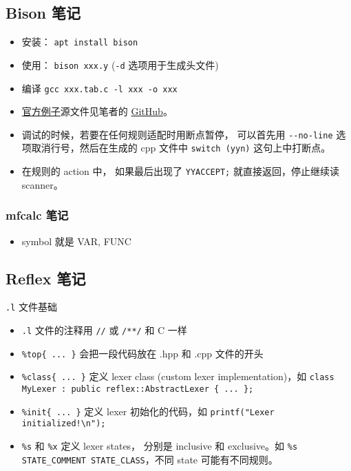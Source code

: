 \subsection{Bison 笔记}
\begin{itemize}
\item 安装： \verb`apt install bison`
\item 使用： \verb`bison xxx.y` (\verb`-d` 选项用于生成头文件)
\item 编译 \verb`gcc xxx.tab.c -l xxx -o xxx`
\item \href{http://web.mit.edu/gnu/doc/html/bison_5.html}{官方例子}源文件见笔者的 \href{https://github.com/MacroUniverse/bison_test}{GitHub}。
\item 调试的时候，若要在任何规则适配时用断点暂停， 可以首先用 \verb`--no-line` 选项取消行号，然后在生成的 cpp 文件中 \verb`switch (yyn)` 这句上中打断点。
\item 在规则的 action 中， 如果最后出现了 \verb`YYACCEPT;` 就直接返回，停止继续读 scanner。
\end{itemize}

\subsubsection{mfcalc 笔记}
\begin{itemize}
\item symbol 就是 VAR, FUNC
\end{itemize}

\subsection{Reflex 笔记}
\verb`.l` 文件基础
\begin{itemize}
\item \verb`.l` 文件的注释用 \verb`//` 或 \verb`/**/` 和 C 一样
\item \verb`%top{ ... }` 会把一段代码放在 .hpp 和 .cpp 文件的开头
\item \verb`%class{ ... }` 定义 lexer class (custom lexer implementation)，如 \verb`class MyLexer : public reflex::AbstractLexer { ... };`
\item \verb`%init{ ... }` 定义 lexer 初始化的代码，如 \verb`printf("Lexer initialized!\n");`
\item \verb`%s` 和 \verb`%x` 定义 lexer states， 分别是 inclusive 和 exclusive。如 \verb`%s STATE_COMMENT STATE_CLASS`，不同 state 可能有不同规则。
\end{itemize}
